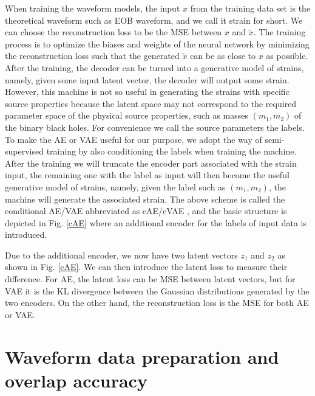 \documentclass[twocolumn,prd,superscriptaddress,nofootinbib]{revtex4-1}
\begin{document}
  

 
When training the waveform models, the input $x$ from the training data set is the theoretical waveform such as EOB waveform, and we call it strain for short. We can choose the reconstruction loss to be the MSE between $x$ and $\tilde{x}$. The training process is to optimize the biases and weights of the neural network by minimizing the reconstruction loss such that the generated $\tilde{x}$ can be as close to $x$ as possible. After the training, the decoder can be turned into a generative model of strains, namely, given some input latent vector, the decoder will output some strain. However, this machine is not so useful in generating the strains with specific source properties because the latent space may not correspond to the required parameter space of the physical source properties, such as masses $(m_1,m_2)$ of the binary black holes. For convenience we call the source parameters the labels. To make the AE or VAE useful for our purpose, we adopt the way of semi-supervised training by also conditioning the labels when training the machine. After the training we will truncate the encoder part associated with the strain input, the remaining one with the label as input will then become the useful generative model of strains, namely, given the label such as $(m_1,m_2)$, the machine will generate the associated strain. The above scheme is called the conditional AE/VAE abbreviated as cAE/cVAE \cite{Sohn2015LearningSO,nguyen2017plug,tonolini2020variational}, and the basic structure is depicted in Fig. \ref{cAE} where an additional encoder for the labels of input data is introduced.



Due to the additional encoder, we now have two latent vectors $z_1$ and $z_2$ as shown in Fig. \ref{cAE}. We can then introduce the latent loss to measure their difference. For AE, the latent loss can be MSE between latent vectors, but for VAE it is the KL divergence between the Gaussian distributions generated by the two encoders. On the other hand, the reconstruction loss is the MSE for both AE or VAE.






\section{Waveform data preparation and overlap accuracy}\label{sec: waveform data}
\end{document}
